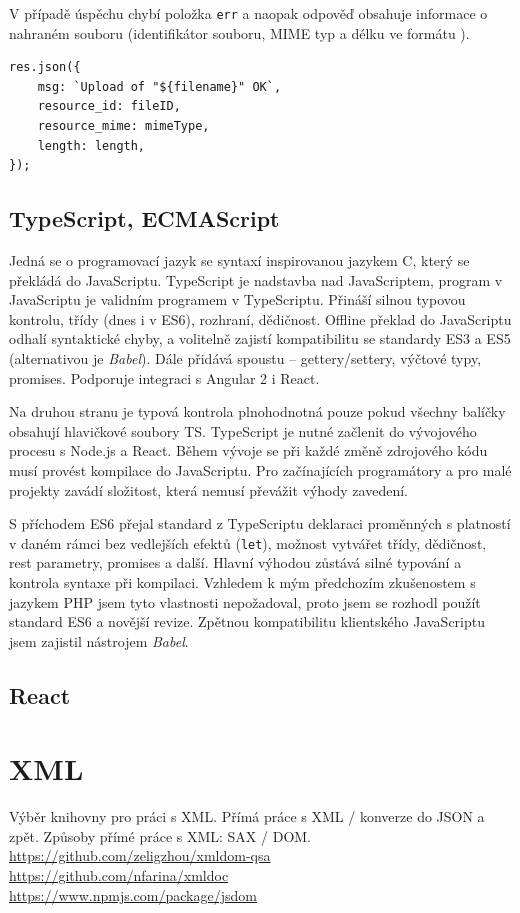 V případě úspěchu chybí položka \texttt{err} a naopak odpověď obsahuje informace o nahraném souboru (identifikátor souboru, MIME typ a délku ve formátu ).
\begin{lstlisting}[style=JavaScript]
res.json({
    msg: `Upload of "${filename}" OK`,
    resource_id: fileID,
    resource_mime: mimeType,
    length: length,
});
\end{lstlisting}

\subsection{TypeScript, ECMAScript}
Jedná se o programovací jazyk se syntaxí inspirovanou jazykem C, který se překládá do JavaScriptu. TypeScript je nadstavba nad JavaScriptem, program v JavaScriptu je validním programem v TypeScriptu. Přináší silnou typovou kontrolu, třídy (dnes i v ES6), rozhraní, dědičnost. Offline překlad do JavaScriptu odhalí syntaktické chyby, a volitelně zajistí kompatibilitu se standardy ES3 a ES5 (alternativou je \textit{Babel}). Dále přidává spoustu  -- gettery/settery, výčtové typy, promises. Podporuje integraci s Angular 2 i React.

Na druhou stranu je typová kontrola plnohodnotná pouze pokud všechny balíčky obsahují hlavičkové soubory TS. TypeScript je nutné začlenit do vývojového procesu s Node.js a React. Během vývoje se při každé změně zdrojového kódu musí provést kompilace do JavaScriptu. Pro začínajících programátory a pro malé projekty zavádí složitost, která nemusí převážit výhody zavedení.

S příchodem ES6 přejal standard z TypeScriptu deklaraci proměnných s platností v daném rámci bez vedlejších efektů (\texttt{let}), možnost vytvářet třídy, dědičnost, rest parametry, promises a další. Hlavní výhodou zůstává silné typování a kontrola syntaxe při kompilaci. Vzhledem k mým předchozím zkušenostem s jazykem PHP jsem tyto vlastnosti nepožadoval, proto jsem se rozhodl použít standard ES6 a novější revize. Zpětnou kompatibilitu klientského JavaScriptu jsem zajistil nástrojem \textit{Babel}.

\subsection{React}

\section{XML}
Výběr knihovny pro práci s XML.
Přímá práce s XML / konverze do JSON a zpět.
Způsoby přímé práce s XML: SAX / DOM.
\url{https://github.com/zeligzhou/xmldom-qsa}\\
\url{https://github.com/nfarina/xmldoc}\\
\url{https://www.npmjs.com/package/jsdom}

